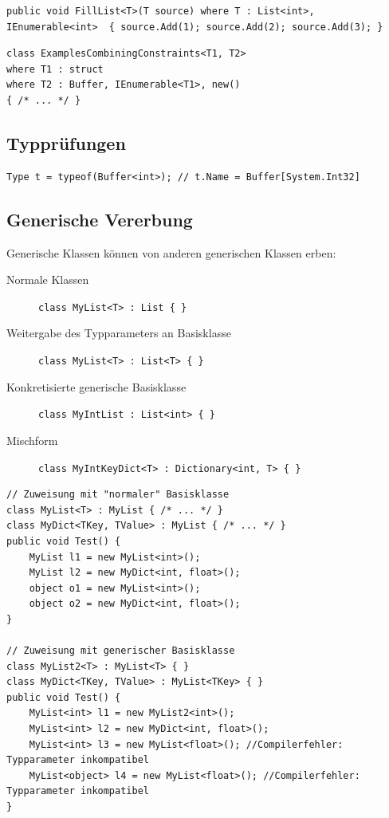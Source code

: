 \documentclass[
a4paper,
oneside,
10pt,
fleqn,
headsepline,
toc=listofnumbered, 
bibliography=totocnumbered]{scrartcl}
\begin{document}
\begin{lstlisting}
public void FillList<T>(T source) where T : List<int>, IEnumerable<int>  { source.Add(1); source.Add(2); source.Add(3); }
\end{lstlisting}


\begin{lstlisting}
class ExamplesCombiningConstraints<T1, T2>
where T1 : struct 
where T2 : Buffer, IEnumerable<T1>, new()
{ /* ... */ } 
\end{lstlisting}

\subsection{Typprüfungen}
\begin{lstlisting}
Type t = typeof(Buffer<int>); // t.Name = Buffer[System.Int32]
\end{lstlisting}

\subsection{Generische Vererbung}
Generische Klassen können von anderen generischen Klassen erben:
\begin{description}
	\item[Normale Klassen] \lstinline|class MyList<T> : List { } |
	\item[Weitergabe des Typparameters an Basisklasse] \lstinline|class MyList<T> : List<T> { } |
	\item [Konkretisierte generische Basisklasse] \lstinline|class MyIntList : List<int> { } |
	\item[Mischform] \lstinline|class MyIntKeyDict<T> : Dictionary<int, T> { } |
\end{description}
\begin{lstlisting}
// Zuweisung mit "normaler" Basisklasse
class MyList<T> : MyList { /* ... */ } 
class MyDict<TKey, TValue> : MyList { /* ... */ } 
public void Test() {
    MyList l1 = new MyList<int>();
    MyList l2 = new MyDict<int, float>();
    object o1 = new MyList<int>();
    object o2 = new MyDict<int, float>(); 
} 

// Zuweisung mit generischer Basisklasse
class MyList2<T> : MyList<T> { } 
class MyDict<TKey, TValue> : MyList<TKey> { }
public void Test() { 
    MyList<int> l1 = new MyList2<int>();
    MyList<int> l2 = new MyDict<int, float>();
    MyList<int> l3 = new MyList<float>(); //Compilerfehler: Typparameter inkompatibel
    MyList<object> l4 = new MyList<float>(); //Compilerfehler: Typparameter inkompatibel
}
\end{lstlisting}
\end{document}
